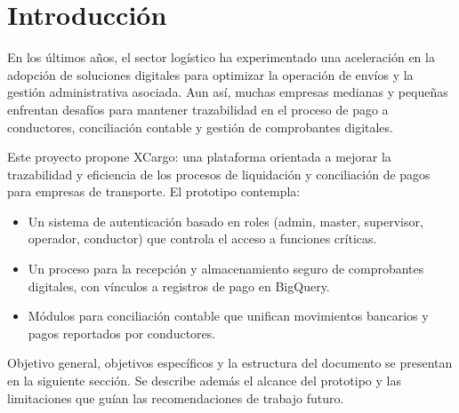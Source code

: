 \chapter{Introducción}

En los últimos años, el sector logístico ha experimentado una aceleración en la adopción de soluciones digitales para optimizar la operación de envíos y la gestión administrativa asociada. Aun así, muchas empresas medianas y pequeñas enfrentan desafíos para mantener trazabilidad en el proceso de pago a conductores, conciliación contable y gestión de comprobantes digitales.

Este proyecto propone XCargo: una plataforma orientada a mejorar la trazabilidad y eficiencia de los procesos de liquidación y conciliación de pagos para empresas de transporte. El prototipo contempla:

\begin{itemize}
    \item Un sistema de autenticación basado en roles (admin, master, supervisor, operador, conductor) que controla el acceso a funciones críticas.
    \item Un proceso para la recepción y almacenamiento seguro de comprobantes digitales, con vínculos a registros de pago en BigQuery.
    \item Módulos para conciliación contable que unifican movimientos bancarios y pagos reportados por conductores.
\end{itemize}

Objetivo general, objetivos específicos y la estructura del documento se presentan en la siguiente sección. Se describe además el alcance del prototipo y las limitaciones que guían las recomendaciones de trabajo futuro.
